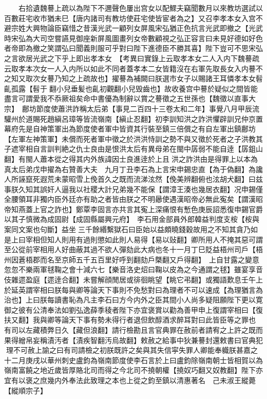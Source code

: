 　　右拾遺魏謩上疏以為陛下不邇聲色屢出宫女以配鰥夫竊聞數月以來教坊選試以百數莊宅收市猶未巳【唐内諸司有教坊使莊宅使皆宦者為之】又召李孝本女入宫不避宗姓大興物論臣竊惜之昔漢光武一顧列女屏風宋弘猶正色抗言光武即撤之【光武時宋弘為大司空嘗讌見御座新屏風圖畫列女帝數顧視之弘正容言曰未見好德如好色者帝即為撤之笑謂弘曰聞義則服可乎對曰陛下進德臣不勝其喜】陛下豈可不思宋弘之言欲居光武之下乎上即出孝本女　【考異曰實錄上云取孝本女二人入内下魏謩疏云取孝本次女一人入内所以如此不同者蓋孝本二女皆籍沒在右軍先取長女入内謩不之知又取次女謩乃知之上疏故也】擢謩為補闕曰朕選市女子以賜諸王耳憐孝本女髫齓孤露【髫于翻小兒垂髪也齓初觀翻小兒毁齒也】故收養宫中謩於疑似之間皆能盡言可謂愛我不忝厥祖矣命中書優為制辭以賞之謩徵之五世孫也【魏徵以直事大宗】　鄜坊節度使蕭洪詐稱太后弟【事見二百四十三卷太和二年】事覺八月甲辰流驩州於道賜死趙縝呂璋等皆流嶺南【縝止忍翻】初李訓知洪之詐洪懼辟訓兄仲京置幕府先是自神策軍出為節度使者軍中皆資其行裝至鎮三倍償之有自左軍出鎮鄜坊【左軍左神策軍】未償而死者軍中徵之於洪洪恃訓之勢不與又徵於死者之子洪教其子遮宰相自言訓判絶之仇士良由是恨洪太后有異母弟在閩中孱弱不能自逹【孱鉏山翻】有閩人蕭本從之得其内外族諱因士良進逹於上且洪之詐洪由是得罪上以本為真太后弟戊申擢為右贊善大夫　九月丁丑李石為上言宋申錫忠直【為于偽翻】為讒人所誣竄死遐荒未蒙昭雪上俛首久之既而流涕泫然【俛美辨翻俯也泫胡犬翻】曰兹事朕久知其誤奸人逼我以社稷大計兄弟幾不能保【謂漳王湊也幾居衣翻】况申錫僅全腰領耳非獨内臣外廷亦有助之者皆由朕之不明曏使遇漢昭帝必無此寃矣【謂漢昭帝知燕蓋上官之詐也】鄭覃李固言亦共言其寃上深痛恨有慙色庚辰詔悉復申錫官爵以其子慎微為成固尉【成固縣屬興元府】　李石用金部員外郎韓益判度支桉【桉與案同文案也句斷】益坐三千餘緡繫獄石曰臣始以益頗曉錢穀故用之不知其貪乃如是上曰宰相但知人則用有過則懲如此則人易得【易以䜴翻】卿所用人不掩其惡可謂至公從前宰相用人好曲蔽其過不欲人彈劾此大病也冬十一月丁巳貶益梧州司戶【梧州因蒼梧郡而名至京師五千五百里好呼到翻劾戶槩翻又戶得翻】　上自甘露之變意忽忽不樂兩軍毬鞠之會十減六七【樂音洛史炤曰鞠以皮為之今通謂之毬】雖宴享音伎雜遝盈庭【遝逹合翻】未嘗解顔閒居或徘徊眺望【眺它弔翻】或獨語歎息壬午上於延英謂宰相曰朕每與卿等論天下事則不免愁對曰為理者不可以速成【為理猶言為治也】上曰朕每讀書恥為凡主李石曰方今内外之臣其間小人尚多疑阻願陛下更以寛御之彼有公清奉法如劉弘逸薛季稜者陛下亦宜褒賞以勸為善甲申上復謂宰相曰【復扶又翻】我與卿等論天下事有勢未得行者退但飲醇酒求醉耳對曰此皆臣等之罪也　有司以左藏積弊日久【藏但浪翻】請行檢勘且言官典罪在赦前者請宥之上許之既而果得繒帛妄稱漬汚者【漬疾智翻汚烏故翻】敕赦之給事中狄兼謩封還敕書曰官典犯理不可赦上諭之曰有司請檢之初朕既許之矣與其失信寜失罪人卿能奉軄朕甚嘉之　十二月庚戌以華州刺史盧鈞為嶺南節度使李石言於上曰盧鈞除嶺南朝士皆相賀以為嶺南富饒之地近歲皆厚賂北司而得之今北司不撓朝權【撓奴巧翻又奴教翻】陛下亦宜有以褒之庶幾内外奉法此致理之本也上從之鈞至鎮以清惠著名　己未淑王縱薨【縱順宗子】

